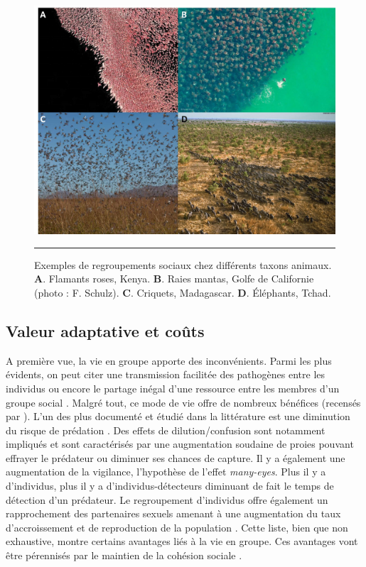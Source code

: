 \begin{figure}[ht]
	\centering
		\includegraphics[width=0.85 \textwidth]{Figures/groupes_pdf.jpg}
		\rule{35em}{0.5pt}
	\caption[Group]{Exemples de regroupements sociaux chez différents taxons animaux. \textbf{A}. Flamants roses, Kenya. \textbf{B}. Raies mantas, Golfe de Californie (photo : F. Schulz). \textbf{C}. Criquets, Madagascar. \textbf{D}. Éléphants, Tchad.}
	\label{fig:group}
\end{figure}


    \subsection{Valeur adaptative et coûts}
    \label{subsec:benef}
A première vue, la vie en groupe apporte des inconvénients. Parmi les plus évidents, on peut citer une transmission facilitée des pathogènes entre les individus ou encore le partage inégal d'une ressource entre les membres d'un groupe social \cite{danchin_ecologie_2005}. Malgré tout, ce mode de vie offre de nombreux bénéfices (recensés par \citet{krause_living_2002}). L'un des plus documenté et étudié dans la littérature est une diminution du risque de prédation \cite{vulinec_collective_1990}. Des effets de dilution/confusion sont notamment impliqués et sont caractérisés par une augmentation soudaine de proies pouvant effrayer le prédateur ou diminuer ses chances de capture. Il y a également une augmentation de la vigilance, l'hypothèse de l'effet \textit{many-eyes}. Plus il y a d'individus, plus il y a d'individus-détecteurs diminuant de fait le temps de détection d'un prédateur. Le regroupement d'individus offre également un rapprochement des partenaires sexuels amenant à une augmentation du taux d'accroissement et de reproduction de la population \cite{courchamp_allee_2008}. Cette liste, bien que non exhaustive, montre certains avantages liés à la vie en groupe. Ces avantages vont être pérennisés par le maintien de la cohésion sociale \cite{krause_living_2002}.
    


